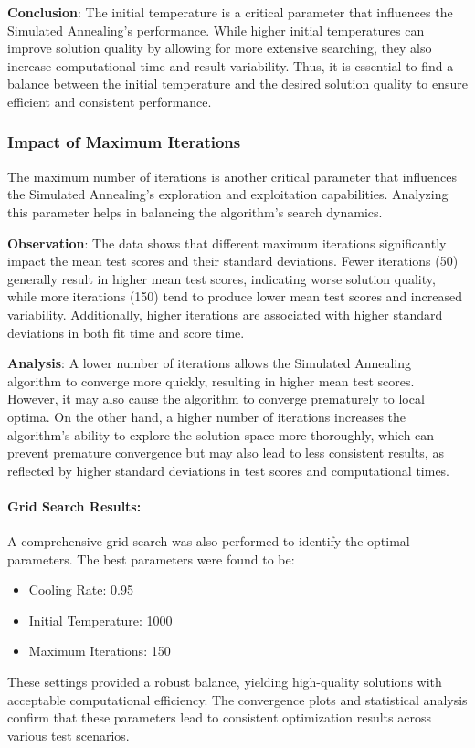 \documentclass[
]{article}
\begin{document}
    \textbf{Conclusion}: The initial temperature is a critical parameter that influences the Simulated Annealing's performance. While higher initial temperatures can improve solution quality by allowing for more extensive searching, they also increase computational time and result variability. Thus, it is essential to find a balance between the initial temperature and the desired solution quality to ensure efficient and consistent performance.

    \subsubsection{Impact of Maximum Iterations}

    The maximum number of iterations is another critical parameter that influences the Simulated Annealing’s exploration and exploitation capabilities. Analyzing this parameter helps in balancing the algorithm’s search dynamics.

    \textbf{Observation}: The data shows that different maximum iterations significantly impact the mean test scores and their standard deviations. Fewer iterations (50) generally result in higher mean test scores, indicating worse solution quality, while more iterations (150) tend to produce lower mean test scores and increased variability. Additionally, higher iterations are associated with higher standard deviations in both fit time and score time.

    \textbf{Analysis}: A lower number of iterations allows the Simulated Annealing algorithm to converge more quickly, resulting in higher mean test scores. However, it may also cause the algorithm to converge prematurely to local optima. On the other hand, a higher number of iterations increases the algorithm's ability to explore the solution space more thoroughly, which can prevent premature convergence but may also lead to less consistent results, as reflected by higher standard deviations in test scores and computational times.

    \paragraph{Grid Search Results:}
    A comprehensive grid search was also performed to identify the optimal parameters. The best parameters were found to be:
    \begin{itemize}
        \item Cooling Rate: 0.95
        \item Initial Temperature: 1000
        \item Maximum Iterations: 150
    \end{itemize}
    These settings provided a robust balance, yielding high-quality solutions with acceptable computational efficiency. The convergence plots and statistical analysis confirm that these parameters lead to consistent optimization results across various test scenarios.
\end{document}
